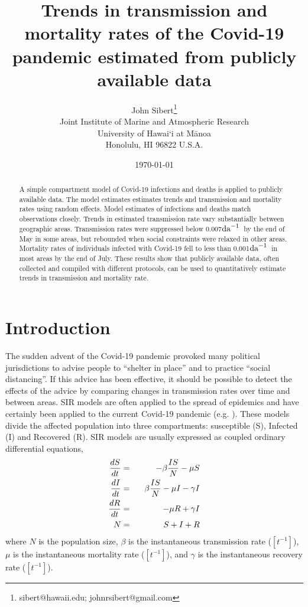 \documentclass[12pt,letterpaper]{article}
\title{Trends in transmission and mortality rates of the Covid-19
pandemic estimated from publicly available data}
\author{
John Sibert\thanks{sibert@hawaii.edu; johnrsibert@gmail.com}\\
Joint Institute of Marine and Atmospheric Research\\
University of Hawai`i at M\={a}noa\\
Honolulu, HI  96822 U.S.A.\\[0.125in]
\date{\today}
}
\newcommand\doublespacing{\baselineskip=1.6\normalbaselineskip}
\newcommand\perda{$\rm{da}^{-1}$}
\begin{document}
\maketitle

\doublespacing

\begin{abstract}
A simple compartment model of Covid-19 infections and deaths is
applied to publicly available data. The model estimates estimates
trends and transmission
and mortality rates using random effects. Model estimates of
infections and deaths match observations closely. Trends in
estimated transmission rate vary substantially between geographic
areas. Transmission rates were suppressed below 0.007\perda\ by the
end of May in some areas, but rebounded when social constraints
were relaxed in other areas.
Mortality rates of individuals infected with Covid-19 fell to less than
0.001\perda\ in most areas by the end of July.
These results show that publicly available data, often collected and
compiled with different protocols, can be used to quantitatively
estimate trends in transmission and mortality rate.
\end{abstract}

\section*{Introduction}

The sudden advent of the Covid-19 pandemic provoked many political
jurisdictions to advise people to ``shelter in place'' and to practice
``social distancing''. If this advice has been effective, it should be
possible to detect the effects of the advice by comparing changes in
transmission rates over time and between areas. 
SIR models are often applied to the spread of epidemics and have
certainly been applied to the current Covid-19 pandemic
(e.g. \cite{Chen2020,Roques2020}).
These models divide the affected population into three
compartments: susceptible (S), Infected (I) and Recovered (R).
SIR models are
usually expressed as coupled ordinary differential equations,
\begin{eqnarray}
\label{eqn:SIR}
\frac{dS}{dt} &=& -\beta\frac{IS}{N} - \mu S\\
\frac{dI}{dt} &=& \hphantom{-}\beta\frac{IS}{N} - \mu I -\gamma I\\
\frac{dR}{dt} &=&  -\mu R +\gamma I\\
N &=& S + I + R
\end{eqnarray}
where $N$ is the population size, $\beta$ is the instantaneous
transmission rate ($[t^{-1}]$), $\mu$ is the instantaneous mortality rate
($[t^{-1}]$),
and $\gamma$ is the instantaneous recovery rate ($[t^{-1}]$).  
\end{document}
